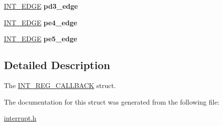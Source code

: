 \begin{DoxyCompactItemize}
\item 
\mbox{\label{structINT__REG__CALLBACK_ad6405304b424fe3dc843c17582538633}} 
\hyperlink{interrupt_8h_affe9baf0034f4cbb8aec6ed2c42b1676}{I\+N\+T\+\_\+\+E\+D\+GE} {\bfseries pd3\+\_\+edge}
\item 
\mbox{\label{structINT__REG__CALLBACK_a56c033a69ca99c16108e525437dc55c3}} 
\hyperlink{interrupt_8h_affe9baf0034f4cbb8aec6ed2c42b1676}{I\+N\+T\+\_\+\+E\+D\+GE} {\bfseries pe4\+\_\+edge}
\item 
\mbox{\label{structINT__REG__CALLBACK_ad192d736896bae445961e765a3ee816c}} 
\hyperlink{interrupt_8h_affe9baf0034f4cbb8aec6ed2c42b1676}{I\+N\+T\+\_\+\+E\+D\+GE} {\bfseries pe5\+\_\+edge}
\end{DoxyCompactItemize}


\subsection{Detailed Description}
The \hyperlink{structINT__REG__CALLBACK}{I\+N\+T\+\_\+\+R\+E\+G\+\_\+\+C\+A\+L\+L\+B\+A\+CK} struct. 

The documentation for this struct was generated from the following file\+:\begin{DoxyCompactItemize}
\item 
\hyperlink{interrupt_8h}{interrupt.\+h}\end{DoxyCompactItemize}
